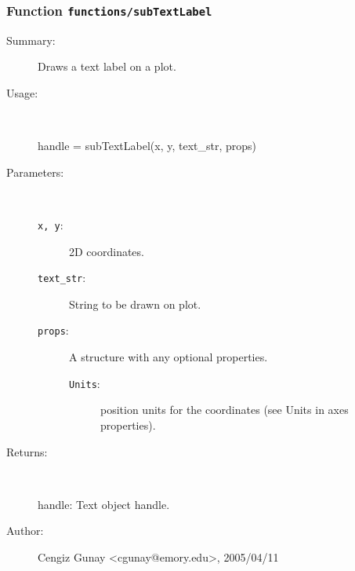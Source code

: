 \subsubsection[Function \texttt{subTextLabel}]{Function \texttt{functions/subTextLabel}}%
%
\label{ref_functions__subTextLabel}%
\hypertarget{ref_functions__subTextLabel}{}%
\begin{description}
\item[Summary:]Draws a text label on a plot.
%
\item[Usage:]~%
\begin{lyxcode}%
handle = subTextLabel(x, y, text\_str, props)
%
\end{lyxcode}%
%
%
\item[Parameters:]~
\begin{description}%
\item[\texttt{x, y}:]
 2D coordinates.
\item[\texttt{text\_str}:]
 String to be drawn on plot.
\item[\texttt{props}:]
 A structure with any optional properties.
\begin{description}%
\item[\texttt{Units}:]
 position units for the coordinates (see Units in axes properties).
\end{description}%
\end{description}%
%
\item[Returns:
]~

	handle: Text object handle.
%
%
%
\item[Author:]%
Cengiz Gunay <cgunay@emory.edu>, 2005/04/11
%
\end{description}
\methodline%
